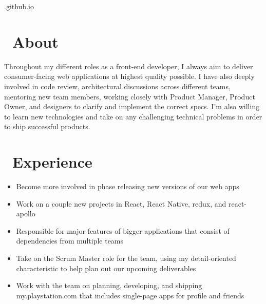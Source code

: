 \documentclass{resume}
\begin{document}


  \nhuhai.github.io

\section{\faInfo\ About}
Throughout my different roles as a front-end developer, I always aim to deliver consumer-facing web applications at highest quality possible. I have also deeply involved in code review, architectural discussions across different teams, mentoring new team members, working closely with Product Manager, Product Owner, and designers to clarify and implement the correct specs. I’m also willing to learn new technologies and take on any challenging technical problems in order to ship successful products.

\section{\faUsers\ Experience}
\begin{itemize}
  \item Become more involved in phase releasing new versions of our web apps
  \item Work on a couple new projects in React, React Native, redux, and react-apollo
  \item Responsible for major features of bigger applications that consist of dependencies from multiple teams
\end{itemize}

\begin{itemize}
  \item Take on the Scrum Master role for the team, using my detail-oriented characteristic to help plan out our upcoming deliverables
  \item Work with the team on planning, developing, and shipping my.playstation.com that includes single-page apps for profile and friends
\end{itemize}
\end{document}
